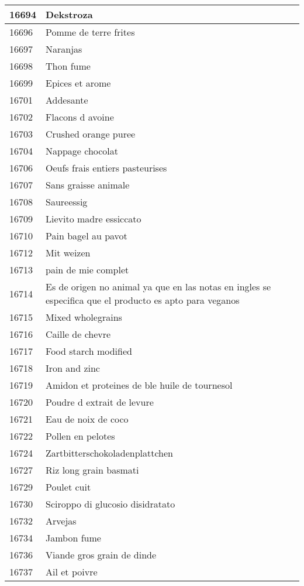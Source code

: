 \begin{longtable}{|l|l|}
16694 & Dekstroza \\ \hline 
16696 & Pomme de terre frites \\ \hline 
16697 & Naranjas \\ \hline 
16698 & Thon fume \\ \hline 
16699 & Epices et arome \\ \hline 
16701 & Addesante \\ \hline 
16702 & Flacons d avoine \\ \hline 
16703 & Crushed orange puree \\ \hline 
16704 & Nappage chocolat \\ \hline 
16706 & Oeufs frais entiers pasteurises \\ \hline 
16707 & Sans graisse animale \\ \hline 
16708 & Saureessig \\ \hline 
16709 & Lievito madre essiccato \\ \hline 
16710 & Pain bagel au pavot \\ \hline 
16712 & Mit weizen \\ \hline 
16713 & pain de mie complet \\ \hline 
16714 & Es de origen no animal ya que en las notas en ingles se especifica que el producto es apto para veganos \\ \hline 
16715 & Mixed wholegrains \\ \hline 
16716 & Caille de chevre \\ \hline 
16717 & Food starch modified \\ \hline 
16718 & Iron and zinc \\ \hline 
16719 & Amidon et proteines de ble huile de tournesol \\ \hline 
16720 & Poudre d extrait de levure \\ \hline 
16721 & Eau de noix de coco \\ \hline 
16722 & Pollen en pelotes \\ \hline 
16724 & Zartbitterschokoladenplattchen \\ \hline 
16727 & Riz long grain basmati \\ \hline 
16729 & Poulet cuit \\ \hline 
16730 & Sciroppo di glucosio disidratato \\ \hline 
16732 & Arvejas \\ \hline 
16734 & Jambon fume \\ \hline 
16736 & Viande gros grain de dinde \\ \hline 
16737 & Ail et poivre \\ \hline 

\end{longtable}
